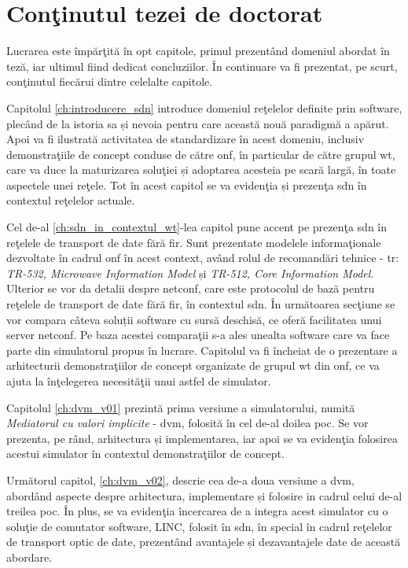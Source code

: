 \section{Conţinutul tezei de doctorat}

Lucrarea este împărţită în opt capitole, primul prezentând domeniul abordat în teză, iar ultimul fiind dedicat concluziilor. În continuare va fi prezentat, pe scurt, conţinutul fiecărui dintre celelalte capitole.

Capitolul \ref{ch:introducere_sdn} introduce domeniul reţelelor definite prin software, plecând de la istoria sa și nevoia pentru care această nouă paradigmă a apărut. Apoi va fi ilustrată activitatea de standardizare în acest domeniu, inclusiv demonstraţiile de concept conduse de către \gls{onf}, în particular de către grupul \gls{wt}, care va duce la maturizarea soluţiei și adoptarea acesteia pe scară largă, în toate aspectele unei reţele. Tot în acest capitol se va evidenţia și prezenţa \gls{sdn} în contextul reţelelor actuale.

Cel de-al \ref{ch:sdn_in_contextul_wt}-lea capitol pune accent pe prezenţa \gls{sdn} în reţelele de transport de date fără fir. Sunt prezentate modelele informaţionale dezvoltate în cadrul \gls{onf} în acest context, având rolul de recomandări tehnice - \gls{tr}: \textit{TR-532, Microwave Information Model} și \textit{TR-512, Core Information Model}. Ulterior se vor da detalii despre \gls{netconf}, care este protocolul de bază pentru reţelele de transport de date fără fir, în contextul \gls{sdn}. În următoarea secţiune se vor compara câteva soluții software cu sursă deschisă, ce oferă facilitatea unui server \gls{netconf}. Pe baza acestei comparaţii s-a ales unealta software care va face parte din simulatorul propus în lucrare. Capitolul va fi încheiat de o prezentare a arhitecturii demonstraţiilor de concept organizate de grupul \gls{wt} din \gls{onf}, ce va ajuta la înţelegerea necesităţii unui astfel de simulator.

Capitolul \ref{ch:dvm_v01} prezintă prima versiune a simulatorului, numită \textit{Mediatorul cu valori implicite} - \gls{dvm}, folosită în cel de-al doilea \gls{poc}. Se vor prezenta, pe rând, arhitectura și implementarea, iar apoi se va evidenţia folosirea acestui simulator în contextul demonstraţiilor de concept.

Următorul capitol, \ref{ch:dvm_v02}, descrie cea de-a doua versiune a \gls{dvm}, abordând aspecte despre arhitectura, implementare și folosire in cadrul celui de-al treilea \gls{poc}. În plus, se va evidenţia încercarea de a integra acest simulator cu o soluţie de comutator software, LINC, folosit în \gls{sdn}, în special în cadrul reţelelor de transport optic de date, prezentând avantajele și dezavantajele date de această abordare.

